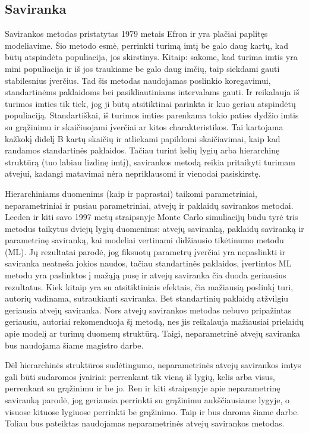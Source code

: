 \documentclass[12pt,a4paper]{article}
\begin{document}
\subsection{Saviranka}

\indent Savirankos metodas pristatytas 1979 metais Efron \cite{efron} ir yra plačiai paplitęs modeliavime. Šio metodo esmė, perrinkti turimą imtį be galo daug kartų, kad būtų atspindėta populiacija, jos skirstinys. Kitaip: sakome, kad turima imtis yra mini populiacija ir iš jos traukiame be galo daug imčių, taip siekdami gauti stabilesnius įverčius. Tad šis metodas naudojamas poslinkio koregavimui, standartinėms paklaidoms bei pasikliautiniams intervalams gauti. Ir reikalauja iš turimos imties tik tiek, jog ji būtų atsitiktinai parinkta ir kuo geriau atspindėtų populiaciją. Standartiškai, iš turimos imties parenkama tokio paties dydžio imtis su grąžinimu ir skaičiuojami įverčiai ar kitos charakteristikos. Tai kartojama kažkokį didelį B kartų skaičių ir atliekami papildomi skaičiavimai, kaip kad randamos standartinės paklaidos. Tačiau turint kelių lygių arba hierarchinę struktūrą (tuo labiau lizdinę imtį), savirankos metodą reikia pritaikyti turimam atvejui, kadangi matavimai nėra nepriklausomi ir vienodai pasiskirstę.

\indent Hierarchiniams duomenims (kaip ir paprastai) taikomi parametriniai, neparametriniai ir pusiau parametriniai, atvejų ir paklaidų savirankos metodai. Leeden ir kiti \cite{bootML} savo 1997 metų straipsnyje Monte Carlo simuliacijų būdu tyrė tris metodus taikytus dviejų lygių duomenims: atvejų saviranką, paklaidų saviranką ir parametrinę saviranką, kai modeliai vertinami didžiausio tikėtinumo metodu (ML). Jų rezultatai parodė, jog fiksuotų parametrų įverčiai yra nepaslinkti ir saviranka neatneša jokios naudos, tačiau standartinės paklaidos, įvertintos ML metodu yra paslinktos į mažąją pusę ir atvejų saviranka čia duoda geriausius rezultatus. Kiek kitaip yra su atsitiktiniais efektais, čia mažiausią poslinkį turi, autorių vadinama, sutraukianti saviranka. Bet standartinių paklaidų atžvilgiu geriausia atvejų saviranka. Nors atvejų savirankos metodas nebuvo pripažintas geriausiu, autoriai rekomenduoja šį metodą, nes jis reikalauja mažiausiai prielaidų apie modelį ar turimų duomenų struktūrą. Taigi, neparametrinė atvejų saviranka bus naudojama šiame magistro darbe.

\indent Dėl hierarchinės struktūros sudėtingumo, neparametrinės atvejų savirankos imtys gali būti sudaromos įvairiai: perrenkant tik vieną iš lygių, kelis arba visus, perrenkant su grąžinimu ir be jo. Ren ir kiti \cite{bootNest} straipsnyje apie neparametrinę saviranką parodė, jog geriausia perrinkti su grąžinimu aukščiausiame lygyje, o visuose kituose lygiuose perrinkti be grąžinimo. Taip ir bus daroma šiame darbe. Toliau bus pateiktas naudojamas neparametrinės atvejų savirankos metodas.
\end{document}
